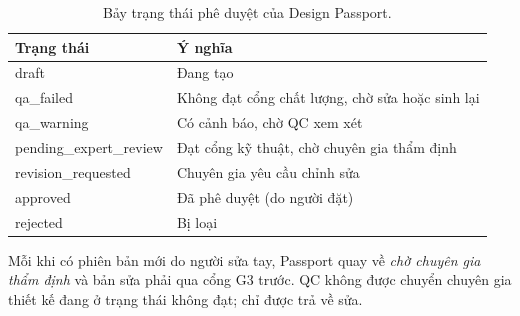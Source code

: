 \documentclass[12pt,a4paper]{report}
\begin{document}
\begin{table}[H]
\centering
\small
\caption{Bảy trạng thái phê duyệt của Design Passport.}
\label{tab:trangthai}
\begin{tabularx}{\textwidth}{>{\ttfamily\raggedright\arraybackslash}p{4.4cm}>{\raggedright\arraybackslash}X}
\toprule
\textbf{Trạng thái} & \textbf{Ý nghĩa} \\
\midrule
draft & Đang tạo \\
qa\_failed & Không đạt cổng chất lượng, chờ sửa hoặc sinh lại \\
qa\_warning & Có cảnh báo, chờ QC xem xét \\
pending\_expert\_review & Đạt cổng kỹ thuật, chờ chuyên gia thẩm định \\
revision\_requested & Chuyên gia yêu cầu chỉnh sửa \\
approved & Đã phê duyệt (do người đặt) \\
rejected & Bị loại \\
\bottomrule
\end{tabularx}
\end{table}

Mỗi khi có phiên bản mới do người sửa tay, Passport quay về \emph{chờ chuyên gia thẩm định} và bản sửa phải qua cổng G3 trước. QC không được chuyển chuyên gia thiết kế đang ở trạng thái không đạt; chỉ được trả về sửa.
\end{document}
